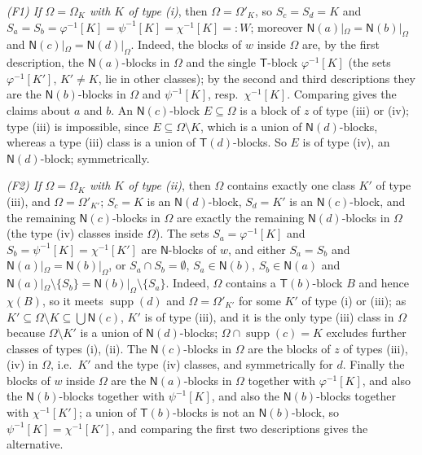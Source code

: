 \documentclass[11pt]{amsart}
\theoremstyle{definition}
\newcommand{\supp}{\operatorname{supp}}
\newcommand{\T}{\mathsf{T}}
\newcommand{\N}{\mathsf{N}}
\begin{document}
\emph{(F1) If $\Omega=\Omega_K$ with $K$ of type \textup{(i)}}, then $\Omega=\Omega'_K$, so $S_c=S_d=K$ and $S_a=S_b=\varphi^{-1}[K]=\psi^{-1}[K]=\chi^{-1}[K]=:W$; moreover $\N(a)|_\Omega=\N(b)|_\Omega$ and $\N(c)|_\Omega=\N(d)|_\Omega$. Indeed, the blocks of $w$ inside $\Omega$ are, by the first description, the $\N(a)$-blocks in $\Omega$ and the single $\T$-block $\varphi^{-1}[K]$ (the sets $\varphi^{-1}[K']$, $K'\ne K$, lie in other classes); by the second and third descriptions they are the $\N(b)$-blocks in $\Omega$ and $\psi^{-1}[K]$, resp.\ $\chi^{-1}[K]$. Comparing gives the claims about $a$ and $b$. An $\N(c)$-block $E\subseteq\Omega$ is a block of $z$ of type (iii) or (iv); type (iii) is impossible, since $E\subseteq\Omega\setminus K$, which is a union of $\N(d)$-blocks, whereas a type (iii) class is a union of $\T(d)$-blocks. So $E$ is of type (iv), an $\N(d)$-block; symmetrically.

\emph{(F2) If $\Omega=\Omega_K$ with $K$ of type \textup{(ii)}}, then $\Omega$ contains exactly one class $K'$ of type (iii), and $\Omega=\Omega'_{K'}$; $S_c=K$ is an $\N(d)$-block, $S_d=K'$ is an $\N(c)$-block, and the remaining $\N(c)$-blocks in $\Omega$ are exactly the remaining $\N(d)$-blocks in $\Omega$ (the type (iv) classes inside $\Omega$). The sets $S_a=\varphi^{-1}[K]$ and $S_b=\psi^{-1}[K]=\chi^{-1}[K']$ are $\N$-blocks of $w$, and either $S_a=S_b$ and $\N(a)|_\Omega=\N(b)|_\Omega$, or $S_a\cap S_b=\emptyset$, $S_a\in\N(b)$, $S_b\in\N(a)$ and $\N(a)|_\Omega\setminus\{S_b\}=\N(b)|_\Omega\setminus\{S_a\}$. Indeed, $\Omega$ contains a $\T(b)$-block $B$ and hence $\chi(B)$, so it meets $\supp(d)$ and $\Omega=\Omega'_{K'}$ for some $K'$ of type (i) or (iii); as $K'\subseteq\Omega\setminus K\subseteq\bigcup\N(c)$, $K'$ is of type (iii), and it is the only type (iii) class in $\Omega$ because $\Omega\setminus K'$ is a union of $\N(d)$-blocks; $\Omega\cap\supp(c)=K$ excludes further classes of types (i), (ii). The $\N(c)$-blocks in $\Omega$ are the blocks of $z$ of types (iii), (iv) in $\Omega$, i.e.\ $K'$ and the type (iv) classes, and symmetrically for $d$. Finally the blocks of $w$ inside $\Omega$ are the $\N(a)$-blocks in $\Omega$ together with $\varphi^{-1}[K]$, and also the $\N(b)$-blocks together with $\psi^{-1}[K]$, and also the $\N(b)$-blocks together with $\chi^{-1}[K']$; a union of $\T(b)$-blocks is not an $\N(b)$-block, so $\psi^{-1}[K]=\chi^{-1}[K']$, and comparing the first two descriptions gives the alternative.
\end{document}
